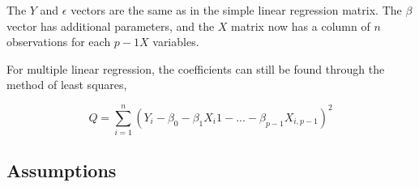 The $Y$ and $\epsilon$ vectors are the same as in the simple linear regression matrix. The $\beta$ vector has additional parameters, and the $X$ matrix now has a column of $n$ observations for each $p-1 X$ variables. 


For multiple linear regression, the coefficients can still be found through the method of least squares, 

$$Q=\sum_{i=1}^{n}(Y_i -\beta_0 - \beta_1 X_i1 - ... - \beta_{p-1}X_{i,p-1})^2$$

	\subsection{Assumptions}
	